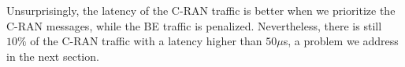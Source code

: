 \documentclass[]{algotel}
\newcommand{\todo}[1]{{\color{red} TODO: {#1}}}
\begin{document}
Unsurprisingly, the latency of the C-RAN traffic is better when we prioritize the C-RAN messages, while the BE traffic is penalized. Nevertheless, there is still $10\%$ of the C-RAN traffic with a latency higher than $50 \mu$s, a problem we address in the next section.


%    
%    
%
%
%
%
%  
%
%  
\end{document}
